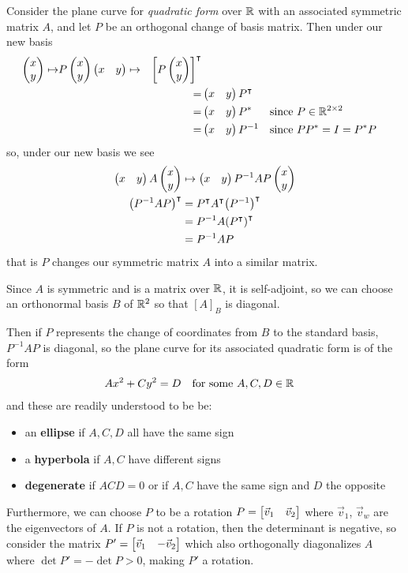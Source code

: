 \begin{remark}
  Consider the plane curve for \emph{quadratic form} over $\mathbb{R}$ with an associated symmetric matrix $A$,
  and let $P$ be an orthogonal change of basis matrix. Then under our new basis
    \begin{align}
      \begin{pmatrix}x \\ y\end{pmatrix} \mapsto & P\begin{pmatrix}x \\ y\end{pmatrix}
      \begin{pmatrix}x & y\end{pmatrix} \mapsto & {\begin{bmatrix}P\begin{pmatrix}x \\ y\end{pmatrix}\end{bmatrix}}^{\intercal} \\
                      & & = & \begin{pmatrix}x & y\end{pmatrix}{P}^{\intercal} \\
                      & & = & \begin{pmatrix}x & y\end{pmatrix}P^* & \text{since }& P \in \mathbb{R}^{2\times2} \\
                      & & = & \begin{pmatrix}x & y\end{pmatrix}P^{-1} & \text{since }& PP^* = I = P^*P
    \end{align}
  so, under our new basis we see
    \begin{align}
      \begin{pmatrix}x & y\end{pmatrix}A\begin{pmatrix}x \\ y\end{pmatrix}
        &\mapsto \begin{pmatrix}x & y\end{pmatrix}P^{-1}AP\begin{pmatrix}x \\ y\end{pmatrix} \\
      {\left(P^{-1}AP\right)}^{\intercal}
        &= {P}^{\intercal}{A}^{\intercal}{\left(P^{-1}\right)}^{\intercal} \\
        &= P^{-1}A{\left({P}^{\intercal}\right)}^{\intercal} \\
        &= P^{-1}AP
    \end{align}
  that is $P$ changes our symmetric matrix $A$ into a similar matrix.

  Since $A$ is symmetric and is a matrix over $\mathbb{R}$, it is self-adjoint,
    so we can choose an orthonormal basis $B$ of $\mathbb{R}^2$ so that $[A]_B$ is diagonal.

  Then if $P$ represents the change of coordinates from $B$ to the standard basis,
    $P^{-1}AP$ is diagonal, so the plane curve for its associated quadratic form is of the form
    \begin{align}
      Ax^2 + Cy^2&=D & \text{for some }& A,C,D \in \mathbb{R}
    \end{align}
  and these are readily understood to be be:
    \begin{itemize}
      \item an {\bf ellipse} if $A, C, D$ all have the same sign
      \item a {\bf hyperbola} if $A, C$ have different signs
      \item {\bf degenerate} if $ACD = 0$ or if $A,C$ have the same sign and $D$ the opposite
    \end{itemize}
  Furthermore, we can choose $P$ to be a rotation $P = \begin{bmatrix} \vec v_1 & \vec v_2 \end{bmatrix}$ where $\vec v_1$, $\vec v_w$ are the eigenvectors of $A$.
  If $P$ is not a rotation, then the determinant is negative, so consider the matrix $P' = \begin{bmatrix}\vec v_1 & -\vec v_2\end{bmatrix}$
  which also orthogonally diagonalizes $A$ where $\det P' = -\det P > 0$, making $P'$ a rotation.
\end{remark}

